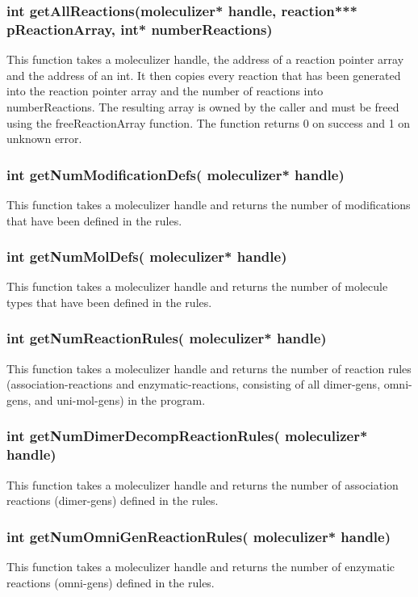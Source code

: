 \subsubsection{int getAllReactions(moleculizer* handle, reaction***
  pReactionArray, int* numberReactions)}
This function takes a moleculizer handle, the address of a reaction
pointer array and the address of an int.  It then copies every
reaction that has been generated into the reaction pointer array and
the number of reactions into numberReactions.  The resulting array is
owned by the caller and must be freed using the freeReactionArray
function.  The function returns 0 on success and 1 on unknown error.

\subsubsection{int getNumModificationDefs( moleculizer* handle)}
This function takes a moleculizer handle and returns the number of
modifications that have been defined in the rules.  


\subsubsection{int getNumMolDefs( moleculizer* handle)}
This function takes a moleculizer handle and returns the number of
molecule types that have been defined in the rules. 

\subsubsection{int getNumReactionRules( moleculizer* handle)}
This function takes a moleculizer handle and returns the number of
reaction rules (association-reactions and enzymatic-reactions,
consisting of all dimer-gens, omni-gens, and uni-mol-gens) in the program.

\subsubsection{int getNumDimerDecompReactionRules( moleculizer*
  handle)}
This function takes a moleculizer handle and returns the number of
association reactions (dimer-gens) defined in the rules. 

\subsubsection{int getNumOmniGenReactionRules( moleculizer* handle)}
This function takes a moleculizer handle and returns the number of
enzymatic reactions (omni-gens) defined in the rules. 

